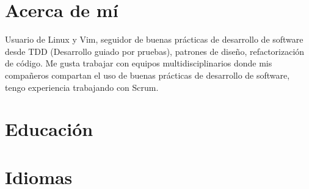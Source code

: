 \documentclass[10pt,a4paper,sans,colorlinks]{moderncv} %
\begin{document}

\makecvtitle %

\section{Acerca de mí}
  Usuario de Linux y Vim, seguidor de buenas prácticas de desarrollo de software desde TDD (Desarrollo guiado por pruebas), patrones de diseño, refactorización de código.
  Me gusta trabajar con equipos multidisciplinarios donde mis compañeros compartan el uso de buenas prácticas de desarrollo de software, tengo experiencia trabajando con Scrum.

\section{Educación}





\section{Idiomas}
\end{document}
